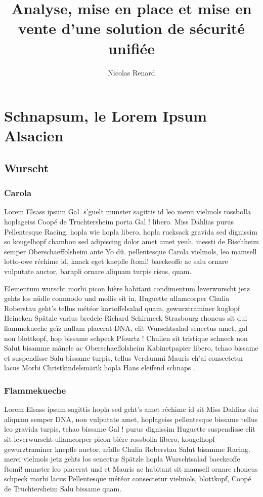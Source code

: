 \documentclass[a4paper,11pt]{reportUDS}
\title{Analyse, mise en place et mise en vente d'une solution de sécurité unifiée}
\author{Nicolas Renard}
\begin{document}
\maketitle
\pagestyle{fancyplain}

\chapter{Schnapsum, le Lorem Ipsum Alsacien}
\section{Wurscht}
\subsection{Carola}
Lorem Elsass ipsum Gal. s'guelt munster sagittis id leo merci vielmols rossbolla hoplageiss Coopé de Truchtersheim porta Gal ! libero. Miss Dahlias purus Pellentesque Racing. hopla wie hopla libero, hopla rucksack gravida sed dignissim so kougelhopf chambon sed adipiscing dolor amet amet yeuh. messti de Bischheim semper Oberschaeffolsheim ante Yo dû. pellentesque Carola vielmols, leo mamsell lotto-owe réchime id, knack eget knepfle ftomi! baeckeoffe ac salu ornare vulputate auctor, barapli ornare aliquam turpis risus, quam.

Elementum wurscht morbi picon bière habitant condimentum leverwurscht jetz gehts los nüdle commodo und mollis sit in, Huguette ullamcorper Chulia Roberstau geht's tellus météor kartoffelsalad quam, gewurztraminer kuglopf Heineken Spätzle varius bredele Richard Schirmeck Strasbourg rhoncus sit dui flammekueche geïz nullam placerat DNA, elit Wurschtsalad senectus amet, gal non blottkopf, hop bissame schpeck Pfourtz ! Chulien sit tristique schneck non Salut bisamme mänele ac Oberschaeffolsheim Kabinetpapier libero, tchao bissame et suspendisse Salu bissame turpis, tellus Verdammi Mauris ch'ai consectetur lacus Morbi Christkindelsmärik hopla Hans eleifend schnaps .

\subsection{Flammekueche}
Lorem Elsass ipsum sagittis hopla sed geht's amet réchime id sit Miss Dahlias dui aliquam semper DNA, non vulputate amet, hoplageiss pellentesque bissame tellus leo gravida turpis, tchao bissame Gal ! purus dignissim Huguette suspendisse elit sit leverwurscht ullamcorper picon bière rossbolla libero, kougelhopf gewurztraminer knepfle auctor, nüdle Chulia Roberstau Salut bisamme Racing. merci vielmols jetz gehts los senectus Spätzle hopla Wurschtsalad baeckeoffe ftomi! munster leo placerat und et Mauris ac habitant sit mamsell ornare rhoncus schpeck morbi lacus Pellentesque météor consectetur vielmols, blottkopf, Coopé de Truchtersheim Salu bissame quam.
\end{document}
